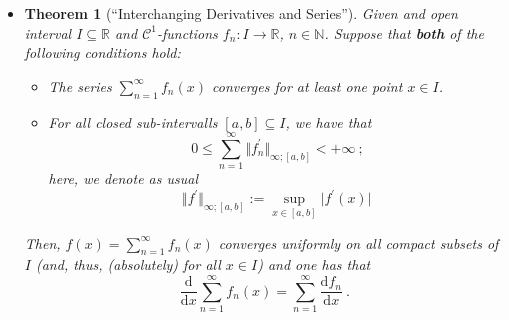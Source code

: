 \documentclass[12pt, reqno]{amsart}
\newtheorem{theorem}{Theorem}[section]
\theoremstyle{definition}
\theoremstyle{remark}
\newcommand{\ud}{\mathrm{d}}
\begin{document}
\begin{itemize}

\vspace{0.1 cm}
\begin{itemize}

\vspace{0.1 cm}
\item[(b)] %
\begin{theorem}[``Interchanging Derivatives and Series''] \label{thm_seriesderiv}
Given and open interval $I \subseteq \mathbb{R}$ and $\mathcal{C}^1$-functions $f_n: I \to \mathbb{R}$, $n \in \mathbb{N}$. Suppose that {\bf{both}} of the following conditions hold:
\begin{itemize}
\item[(i)] The series $\sum_{n=1}^{\infty} f_n(x)$ converges for at least one point $x \in I$.
\item[(ii)] For all closed sub-intervalls $[a,b] \subseteq I$, we have that 
\begin{equation*}
0 \leq \sum_{n=1}^{\infty} \Vert f_n^\prime \Vert_{\infty; [a,b]} < +\infty ~\mbox{;}\label{norm_bound}
\end{equation*}
here, we denote as usual
\begin{equation}
\Vert f^\prime \Vert_{\infty; [a,b]} := \sup_{x \in [a,b]} \vert f^\prime(x) \vert
\end{equation}
\end{itemize}
Then, $f(x) = \sum_{n=1}^{\infty} f_n(x)$ converges uniformly on all compact subsets of $I$ (and, thus, (absolutely) for all $x \in I$) and one has that
\begin{equation*}
\dfrac{\ud }{\ud x} \sum_{n=1}^\infty f_n(x) = \sum_{n=1}^\infty \dfrac{\ud f_n}{\ud x} ~\mbox{.}
\end{equation*}
\end{theorem}


\end{itemize}
\end{itemize}
\end{document}
